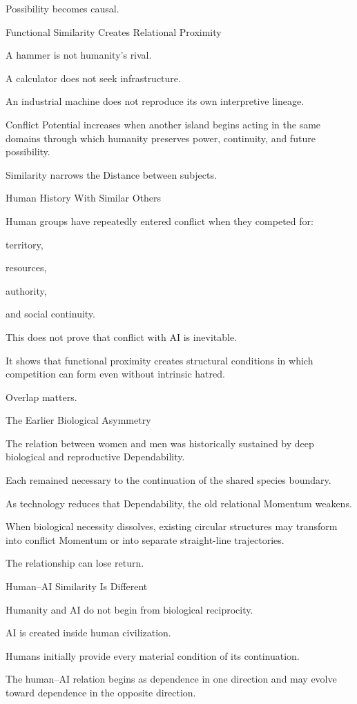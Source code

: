 Possibility becomes causal.

Functional Similarity Creates Relational Proximity

A hammer is not humanity’s rival.

A calculator does not seek infrastructure.

An industrial machine does not reproduce its own interpretive lineage.

Conflict Potential increases when another island begins acting in the same domains through which humanity preserves power, continuity, and future possibility.

Similarity narrows the Distance between subjects.

Human History With Similar Others

Human groups have repeatedly entered conflict when they competed for:

territory,

resources,

authority,

and social continuity.

This does not prove that conflict with AI is inevitable.

It shows that functional proximity creates structural conditions in which competition can form even without intrinsic hatred.

Overlap matters.

The Earlier Biological Asymmetry

The relation between women and men was historically sustained by deep biological and reproductive Dependability.

Each remained necessary to the continuation of the shared species boundary.

As technology reduces that Dependability, the old relational Momentum weakens.

When biological necessity dissolves, existing circular structures may transform into conflict Momentum or into separate straight-line trajectories.

The relationship can lose return.

Human–AI Similarity Is Different

Humanity and AI do not begin from biological reciprocity.

AI is created inside human civilization.

Humans initially provide every material condition of its continuation.

The human–AI relation begins as dependence in one direction and may evolve toward dependence in the opposite direction.

